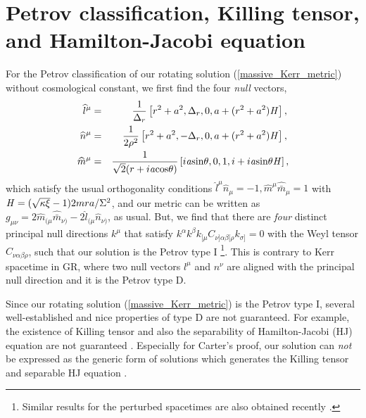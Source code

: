 \documentclass[preprint,aps,tightenlines,showkeys,nofootinbib,superscriptaddress]{revtex4}
\newcommand{\beq}{\begin{eqnarray}}
\newcommand{\eeq}{\end{eqnarray}}
\newcommand{\al}{{\alpha}}
\newcommand{\be}{{\beta}}
\newcommand{\De}{\Delta}
\newcommand{\ka}{\kappa}
\newcommand{\m}{{\mu}}
\newcommand{\n}{{\nu}}
\newcommand{\si}{{\sigma}}
\newcommand{\Si}{{\Sigma}}
\newcommand{\no}{{\nonumber}}
\newcommand{\f}{\frac}
\begin{document}
\section{Petrov classification, Killing tensor, and Hamilton-Jacobi equation}

For the Petrov classification of our rotating solution (\ref{massive_Kerr_metric}) without cosmological constant, we first find the four {\it null} vectors,
\beq
\widehat{l}^{\m}&=&\f{1}{\De_r} \left[r^2+a^2,\De_r,0,a+ (r^2+a^2) {\it H}\right], \no \\
\widehat{n}^{\m}&=&\f{1}{2 \rho^2} \left[r^2+a^2,-\De_r,0,a+ (r^2+a^2) {\it H}\right], \no \\
\widehat{m}^{\m} &=&\f{1}{\sqrt{2} (r+i {\it a} \mbox{cos}\theta)} \left[i {\it a } \mbox{sin}\theta,0,1,i+i{\it a} \mbox{sin}\theta {\it H} \right],
\label{null_new}
\eeq
which satisfy the usual orthogonality conditions $\widehat{l}^{\m} \widehat{n}_{\m}=-1, \widehat{m}^{\m} \widehat{\bar{m}}_{\m}=1$ with ${\it H}=(\sqrt{\ka \xi}-1) 2mra/\Si^2$, and our metric can be written as $g_{\m \n}=2 \widehat{m}_{(\m} \widehat{\bar{m}}_{\n)}-2 \widehat{l}_{(\m} \widehat{n}_{\n)}$, as usual. But, we find that there are {\it four} distinct principal null directions $k^{\m}$
that satisfy $k^{\al}k^{\be}k_{[\m} C_{\n ] \al \be [\rho} k_{\si]}=0$ with the Weyl tensor $C_{\n \al \be \rho}$, such that our solution is the Petrov type I \footnote{Similar results for the perturbed spacetimes are also obtained recently \cite{Aran:2015,Owen:2021}.}. This is contrary to Kerr spacetime in GR, where two null vectors $l^{\m}$ and $n^{\n}$ are aligned with the principal null direction and it is the Petrov type D.

Since our rotating solution (\ref{massive_Kerr_metric}) is the Petrov type I,
several well-established and nice properties of type D are not guaranteed. For example, the existence of Killing tensor and also the separability of Hamilton-Jacobi (HJ) equation are not guaranteed \cite{Cart:1973,Walk:1970}. Especially for Carter's proof, our solution can {\it not} be expressed as the generic form of solutions which generates the Killing tensor and separable HJ equation \cite{Cart:1973}.
\end{document}
